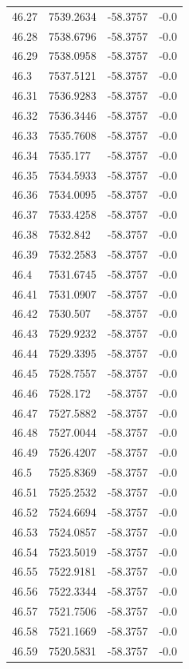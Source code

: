 \begin{table}[H]
\begin{tabular}{llll}
46.27 & 7539.2634 & -58.3757 & -0.0 \\
46.28 & 7538.6796 & -58.3757 & -0.0 \\
46.29 & 7538.0958 & -58.3757 & -0.0 \\
46.3 & 7537.5121 & -58.3757 & -0.0 \\
46.31 & 7536.9283 & -58.3757 & -0.0 \\
46.32 & 7536.3446 & -58.3757 & -0.0 \\
46.33 & 7535.7608 & -58.3757 & -0.0 \\
46.34 & 7535.177 & -58.3757 & -0.0 \\
46.35 & 7534.5933 & -58.3757 & -0.0 \\
46.36 & 7534.0095 & -58.3757 & -0.0 \\
46.37 & 7533.4258 & -58.3757 & -0.0 \\
46.38 & 7532.842 & -58.3757 & -0.0 \\
46.39 & 7532.2583 & -58.3757 & -0.0 \\
46.4 & 7531.6745 & -58.3757 & -0.0 \\
46.41 & 7531.0907 & -58.3757 & -0.0 \\
46.42 & 7530.507 & -58.3757 & -0.0 \\
46.43 & 7529.9232 & -58.3757 & -0.0 \\
46.44 & 7529.3395 & -58.3757 & -0.0 \\
46.45 & 7528.7557 & -58.3757 & -0.0 \\
46.46 & 7528.172 & -58.3757 & -0.0 \\
46.47 & 7527.5882 & -58.3757 & -0.0 \\
46.48 & 7527.0044 & -58.3757 & -0.0 \\
46.49 & 7526.4207 & -58.3757 & -0.0 \\
46.5 & 7525.8369 & -58.3757 & -0.0 \\
46.51 & 7525.2532 & -58.3757 & -0.0 \\
46.52 & 7524.6694 & -58.3757 & -0.0 \\
46.53 & 7524.0857 & -58.3757 & -0.0 \\
46.54 & 7523.5019 & -58.3757 & -0.0 \\
46.55 & 7522.9181 & -58.3757 & -0.0 \\
46.56 & 7522.3344 & -58.3757 & -0.0 \\
46.57 & 7521.7506 & -58.3757 & -0.0 \\
46.58 & 7521.1669 & -58.3757 & -0.0 \\
46.59 & 7520.5831 & -58.3757 & -0.0 \\

\end{tabular}
\end{table}
